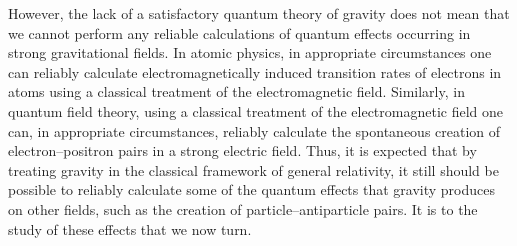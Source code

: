However, the lack of a satisfactory quantum theory of gravity does not mean that
we cannot perform any reliable calculations of quantum effects occurring in strong
gravitational fields. In atomic physics, in appropriate circumstances one can reliably
calculate electromagnetically induced transition rates of electrons in atoms using a
classical treatment of the electromagnetic field. Similarly, in quantum field theory,
using a classical treatment of the electromagnetic field one can, in appropriate
circumstances, reliably calculate the spontaneous creation of electron--positron pairs
in a strong electric field. Thus, it is expected that by treating gravity in the classical
framework of general relativity, it still should be possible to reliably calculate some
of the quantum effects that gravity produces on other fields, such as the creation of
particle--antiparticle pairs. It is to the study of these effects that we now turn.
